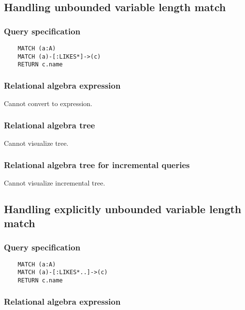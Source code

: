 	\subsection{Handling unbounded variable length match}

	\subsubsection*{Query specification}

	\begin{lstlisting}
	MATCH (a:A)
	MATCH (a)-[:LIKES*]->(c)
	RETURN c.name
	\end{lstlisting}


	\subsubsection*{Relational algebra expression}

	Cannot convert to expression.

	\subsubsection*{Relational algebra tree}

	Cannot visualize tree.

	\subsubsection*{Relational algebra tree for incremental queries}

	Cannot visualize incremental tree.
	\subsection{Handling explicitly unbounded variable length match}

	\subsubsection*{Query specification}

	\begin{lstlisting}
	MATCH (a:A)
	MATCH (a)-[:LIKES*..]->(c)
	RETURN c.name
	\end{lstlisting}


	\subsubsection*{Relational algebra expression}


